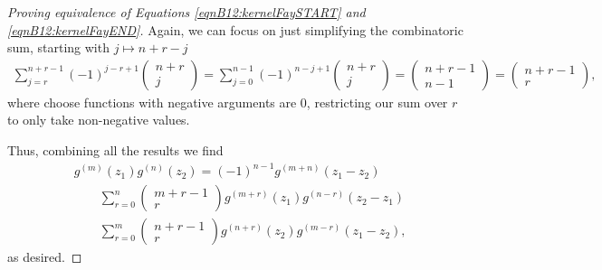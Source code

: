 \begin{proof}[Proving equivalence of Equations \ref{eqnB12:kernelFaySTART} and \ref{eqnB12:kernelFayEND}]
Again, we can focus on just simplifying the combinatoric sum, starting with $j \mapsto n+r-j$
\begin{align}
    \sum_{j=r}^{n+r-1} (-1)^{j-r+1} \begin{pmatrix}n+r \\ j\end{pmatrix} = \sum_{j=0}^{n-1} (-1)^{n-j+1} \begin{pmatrix}n+r \\ j\end{pmatrix} = \begin{pmatrix} n+r-1 \\ n-1 \end{pmatrix} = \begin{pmatrix} n+r-1 \\ r \end{pmatrix},
\end{align}
where choose functions with negative arguments are 0, restricting our sum over $r$ to only take non-negative values.

Thus, combining all the results we find
\begin{align}
    & g^{(m)}(z_1)g^{(n)}(z_2) = (-1)^{n-1} g^{(m+n)}(z_1-z_2) \\
    & \quad \quad \sum_{r=0}^n \begin{pmatrix} m+r-1 \\ r \end{pmatrix} g^{(m+r)}(z_1) g^{(n-r)}(z_2-z_1) \\
    & \quad \quad \sum_{r=0}^m \begin{pmatrix} n+r-1 \\ r \end{pmatrix} g^{(n+r)}(z_2) g^{(m-r)}(z_1-z_2),
\end{align}
as desired.
\end{proof}
